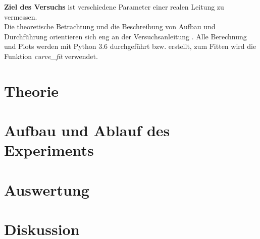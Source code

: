 \documentclass[a4,11pt]{article}
\newcommand{\V}{E2}
\begin{document}



\tableofcontents
\clearpage


\textbf{Ziel des Versuchs} ist verschiedene Parameter einer realen Leitung zu vermessen. \\
Die theoretische Betrachtung und die Beschreibung von Aufbau und Durchführung orientieren sich eng an der Versuchsanleitung \cite{\V}. Alle Berechnung und Plots werden mit Python 3.6 durchgeführt bzw. erstellt, zum Fitten wird die Funktion \textit{curve\_fit} verwendet.

\section{Theorie}

\clearpage


\section{Aufbau und Ablauf des Experiments}

\clearpage


\section{Auswertung}

\clearpage


\section{Diskussion}


\clearpage
\listoftodos
\listoffigures
\listoftables
\clearpage
\nocite{\V}
\printbibliography[title = Literaturverzeichnis]
\end{document}

